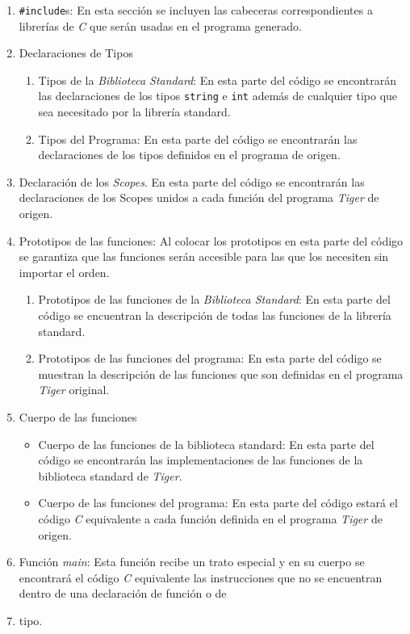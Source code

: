 \documentclass{article}
\begin{document}
\begin{enumerate}
  \item \texttt{\#include}s: En esta sección se incluyen las cabeceras
  correspondientes a librerías de \textit{C} que serán usadas en el programa
  generado.
  \item Declaraciones de Tipos
  	\begin{enumerate}
      \item Tipos de la  \textit{Biblioteca Standard}: En esta parte del código se
      encontrarán las declaraciones de los tipos \texttt{string} e \texttt{int}
      además de cualquier tipo que sea necesitado por la librería standard.
      \item Tipos del Programa: En esta parte del código se encontrarán
      las declaraciones de los tipos definidos en el programa de origen.
  	\end{enumerate}
  \item Declaración de los \textit{Scopes}. En esta parte del código se
  encontrarán las declaraciones de los Scopes unidos a cada función del
  programa \textit{Tiger} de origen.
  \item Prototipos de las funciones: Al colocar los prototipos en esta parte
  del código se garantiza que las funciones serán accesible para las que los
  necesiten sin importar el orden.
	\begin{enumerate}
      \item Prototipos de las funciones de la \textit{Biblioteca Standard}: En
      esta parte del código se encuentran la descripción de todas las funciones
      de la librería standard.
      \item Prototipos de las funciones del programa: En esta parte del código
      se muestran la descripción de las funciones que son definidas en el
      programa \textit{Tiger} original.
    \end{enumerate}
  \item Cuerpo de las funciones
 	\begin{itemize}
          \item Cuerpo de las funciones de la biblioteca standard: En esta
          parte del código se encontrarán las implementaciones de las funciones
          de la biblioteca standard de \textit{Tiger}.
          \item Cuerpo de las funciones del programa: En esta parte del código
          estará el código \textit{C} equivalente a cada función definida en el
          programa \textit{Tiger} de origen.
     \end{itemize}
  \item Función \textit{main}: Esta función recibe un trato especial y en su
  cuerpo se encontrará el código \textit{C} equivalente las instrucciones que
  no se encuentran dentro de una declaración de función o de 
  \item tipo. 
    
       
\end{enumerate}
\end{document}
